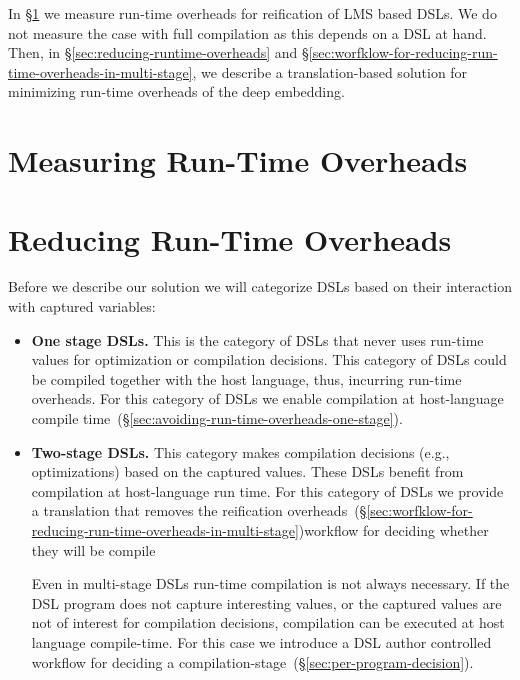 
In \S \ref{sec:measuring-overheads-in-the-deep-embedding} we measure run-time overheads for reification of
 LMS based DSLs. We do not measure the case with full compilation as this depends on a DSL at hand.
 Then, in \S \ref{sec:reducing-runtime-overheads} and \S \ref{sec:worfklow-for-reducing-run-time-overheads-in-multi-stage}, we describe a
 translation-based solution for minimizing run-time overheads of the deep embedding.

\section{Measuring Run-Time Overheads}
\label{sec:measuring-overheads-in-the-deep-embedding}



\section{Reducing Run-Time Overheads}
\label{sec:reducing-run-time-overheads}

Before we describe our solution we will categorize DSLs based on their interaction with captured variables:\begin{itemize}
 \item {\bf One stage DSLs.} This is the category of DSLs that never uses run-time values for optimization or compilation
  decisions. This category of DSLs could be compiled together with the host language, thus, incurring run-time overheads. For
  this category of DSLs we enable compilation at host-language compile time~(\S \ref{sec:avoiding-run-time-overheads-one-stage}).

 \item {\bf Two-stage DSLs.} This category makes compilation decisions (e.g., optimizations) based on the captured values. These
  DSLs benefit from compilation at host-language run time. For this category of DSLs we provide a
  translation that removes the reification overheads~(\S \ref{sec:worfklow-for-reducing-run-time-overheads-in-multi-stage})workflow for deciding whether they will be compile

  Even in multi-stage DSLs run-time compilation is not always necessary. If the DSL program does not capture
  interesting values, or the captured values are not of interest for compilation decisions, compilation can
  be executed at host language compile-time. For this case we introduce a DSL author controlled
  workflow for deciding a compilation-stage~(\S \ref{sec:per-program-decision}).
\end{itemize}

